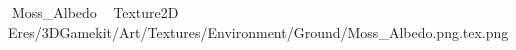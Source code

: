    Moss_Albedo             	   Texture2D
   E   res/3DGamekit/Art/Textures/Environment/Ground/Moss_Albedo.png.tex.png